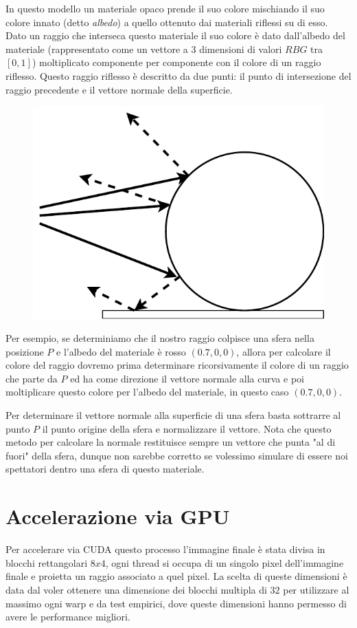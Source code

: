 \documentclass[12pt, twoside]{article}
\begin{document}
In questo modello un materiale opaco prende il suo colore mischiando il suo
colore innato (detto \textit{albedo}) a quello ottenuto dai materiali riflessi
su di esso.
Dato un raggio che interseca questo materiale il suo colore è dato dall'albedo
del materiale (rappresentato come un vettore a 3 dimensioni di valori
$RBG$ tra $[0, 1]$) moltiplicato componente per componente con il colore di un
raggio riflesso.
Questo raggio riflesso è descritto da due punti: il punto di intersezione del
raggio precedente e il vettore normale della superficie.

\begin{figure}[h]
  \centering
  \includegraphics[width=0.3\linewidth,keepaspectratio]{images/LambertianRayReflection.pdf}
\end{figure}

Per esempio, se determiniamo che il nostro raggio colpisce una sfera nella
posizione $P$ e l'albedo del materiale è rosso $(0.7, 0, 0)$, allora per
calcolare il colore del raggio dovremo prima determinare ricorsivamente il
colore di un raggio che parte da $P$ ed ha come direzione il vettore normale
alla curva e poi moltiplicare questo colore per l'albedo del materiale,
in questo caso $(0.7, 0, 0)$.

Per determinare il vettore normale alla superficie di una sfera basta
sottrarre al punto $P$ il punto origine della sfera e normalizzare il
vettore. 
Nota che questo metodo per calcolare la normale restituisce sempre un
vettore che punta "al di fuori" della sfera, dunque non sarebbe corretto
se volessimo simulare di essere noi spettatori dentro una sfera di questo
materiale.

\section{Accelerazione via GPU}
Per accelerare via CUDA questo processo l'immagine finale è stata divisa in
blocchi rettangolari $8 x 4$, ogni thread si occupa di un singolo pixel
dell'immagine finale e proietta un raggio associato a quel pixel.
La scelta di queste dimensioni è data dal voler ottenere una dimensione dei
blocchi multipla di $32$ per utilizzare al massimo ogni warp e da test
empirici, dove queste dimensioni hanno permesso di avere le performance
migliori.
\end{document}
